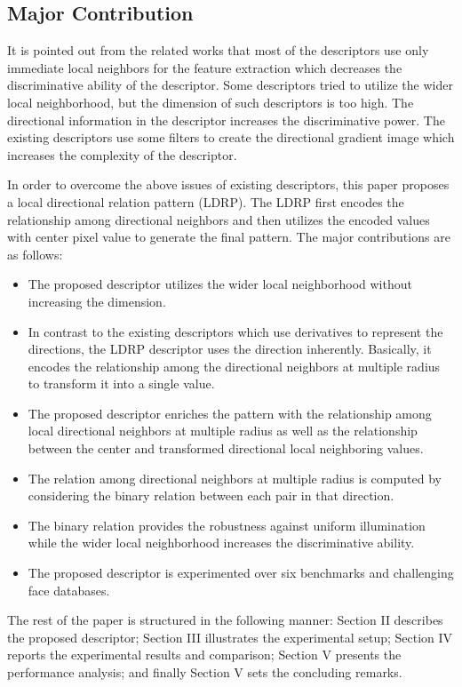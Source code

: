 \documentclass[a4paper]{article}
\begin{document}
\subsection{Major Contribution}
It is pointed out from the related works that most of the descriptors use only immediate local neighbors for the feature extraction which decreases the discriminative ability of the descriptor. Some descriptors tried to utilize the wider local neighborhood, but the dimension of such descriptors is too high. The directional information in the descriptor increases the discriminative power. The existing descriptors use some filters to create the directional gradient image which increases the complexity of the descriptor.

In order to overcome the above issues of existing descriptors, this paper proposes a local directional relation pattern (LDRP). The LDRP first encodes the relationship among directional neighbors and then utilizes the encoded values with center pixel value to generate the final pattern. The major contributions are as follows:
\begin{itemize}
\item The proposed descriptor utilizes the wider local neighborhood without increasing the dimension.
\item In contrast to the existing descriptors which use derivatives to represent the directions, the LDRP descriptor uses the direction inherently. Basically, it encodes the relationship among the directional neighbors at multiple radius to transform it into a single value.
\item The proposed descriptor enriches the pattern with the relationship among local directional neighbors at multiple radius as well as the relationship between the center and transformed directional local neighboring values.
\item The relation among directional neighbors at multiple radius is computed by considering the binary relation between each pair in that direction.
\item The binary relation provides the robustness against uniform illumination while the wider local neighborhood increases the discriminative ability.
\item The proposed descriptor is experimented over six benchmarks and challenging face databases.
\end{itemize}

The rest of the paper is structured in the following manner: Section II describes the proposed descriptor; Section III illustrates the experimental setup; Section IV reports the experimental results and comparison; Section V presents the performance analysis; and finally Section V sets the concluding remarks.
\end{document}
